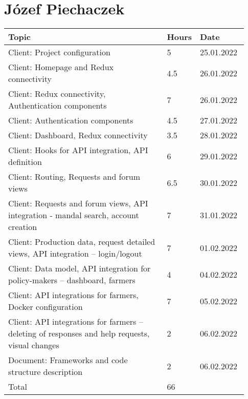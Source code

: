\section*{Józef Piechaczek}
\begin{longtable}{@{}p{0.67\linewidth} p{0.06\linewidth} p{0.20\linewidth}@{}}
    \toprule[1.5pt]
    Topic &  Hours & Date \\ \hline
    Client: Project configuration & 5 & 25.01.2022 \\
    Client: Homepage and Redux connectivity & 4.5 & 26.01.2022 \\
    Client: Redux connectivity, Authentication components & 7 & 26.01.2022 \\
    Client: Authentication components & 4.5 & 27.01.2022 \\
    Client: Dashboard, Redux connectivity & 3.5 & 28.01.2022 \\
    Client: Hooks for API integration, API definition & 6 & 29.01.2022 \\
    Client: Routing, Requests and forum views & 6.5 & 30.01.2022 \\
    Client: Requests and forum views, API integration - mandal search, account creation & 7 & 31.01.2022 \\
    Client: Production data, request detailed views, API integration – login/logout & 7 & 01.02.2022 \\
    Client: Data model, API integration for policy-makers – dashboard, farmers & 4 & 04.02.2022 \\
    Client: API integrations for farmers, Docker configuration & 7 & 05.02.2022 \\
    Client: API integrations for farmers – deleting of responses and help requests, visual changes & 2 & 06.02.2022 \\
    Document: Frameworks and code structure description & 2 & 06.02.2022 \\
    \hline
    Total & 66 & \\
    \bottomrule[1.5pt]
\end{longtable}

